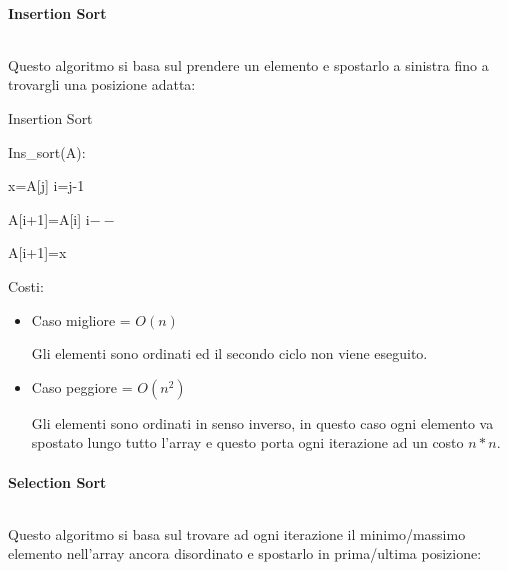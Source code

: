 \documentclass{article}
\begin{document}
\paragraph{Insertion Sort} $\ $\newline

\noindent Questo algoritmo si basa sul prendere un elemento e spostarlo a sinistra fino a trovargli una posizione adatta:

\begin{algorithm}[ht]
\caption{Insertion Sort}
\begin{algorithmic}
\State Ins\_sort(A):


        \State x=A[j]
        \State i=j-1


            \State A[i+1]=A[i]
            \State i$--$

        \EndWhile

        \State A[i+1]=x
    
    \EndFor

\end{algorithmic}
\end{algorithm}

\noindent Costi:
\begin{itemize}
    \item Caso migliore = $O(n)$

    Gli elementi sono ordinati ed il secondo ciclo non viene eseguito.
    
    \item Caso peggiore = $O(n^2)$

    Gli elementi sono ordinati in senso inverso, in questo caso ogni elemento va spostato lungo tutto l'array e questo porta ogni iterazione ad un costo $n*n$.\newline
    
\end{itemize}

\paragraph{Selection Sort} $\ $\newline

\noindent Questo algoritmo si basa sul trovare ad ogni iterazione il minimo/massimo elemento nell'array ancora disordinato e spostarlo in prima/ultima posizione:
\end{document}
